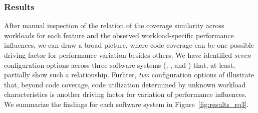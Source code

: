 \subsubsection{Results}
After manual inspection of the relation of the coverage similarity across workloads for each feature and the observed workload-specific performance influences, we can draw a broad picture, where code coverage can be one possible driving factor for performance variation besides others. We have identified \textit{seven} configuration options across three software systems (\jumper, \kanzi, and \dconvert) that, at least, partially show such a relationship. Furhter, \textit{two} configuration options of \htwo illustrate that, beyond code coverage, code utilization determined by unknown workload characteristics is another driving factor for variation of performance influences. We summarize the findings for each software system in Figure~\ref{fig:results_rq3}.

